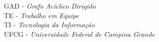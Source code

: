 GAD     - \textit{Grafo Acíclico Dirigido}\\
TE      - \textit{Trabalho em Equipe}\\
TI      - \textit{Tecnologia da Informação}\\
UFCG	- \textit{Universidade Federal de Campina Grande}
